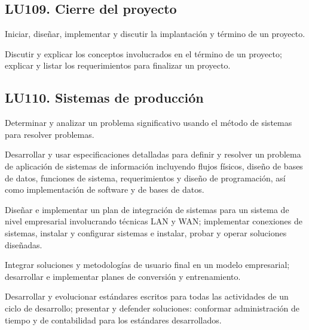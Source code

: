 \subsection{LU109. Cierre del proyecto}\label{sec:LU109}
\begin{LearningUnit}
\begin{LUGoal}
\item Iniciar, diseñar, implementar y discutir la implantación y término de un proyecto.
\end{LUGoal}

\begin{LUObjective}
\item Discutir y explicar los conceptos involucrados en el término de un proyecto; explicar y listar los requerimientos para finalizar un proyecto.
\end{LUObjective}
\end{LearningUnit}

\subsection{LU110. Sistemas de producción}\label{sec:LU110}
\begin{LearningUnit}
\begin{LUGoal}
\item Determinar y analizar un problema significativo usando el método de sistemas para resolver problemas.
\end{LUGoal}

\begin{LUObjective}
\item Desarrollar y usar especificaciones detalladas para definir y resolver un problema de aplicación de sistemas de información incluyendo flujos físicos, diseño de bases de datos, funciones de sistema, requerimientos y diseño de programación, así como  implementación de software y de bases de datos.
\item Diseñar e implementar un plan de integración de sistemas para un sistema de nivel empresarial involucrando técnicas LAN y WAN; implementar conexiones de sistemas, instalar y configurar sistemas e instalar, probar y operar soluciones diseñadas.
\item Integrar soluciones y metodologías de usuario final en un modelo empresarial; desarrollar e implementar planes de conversión y entrenamiento.
\item Desarrollar y evolucionar estándares escritos para todas las actividades de un ciclo de desarrollo; presentar y defender soluciones: conformar administración de tiempo y de contabilidad para los estándares desarrollados.
\end{LUObjective}
\end{LearningUnit}

